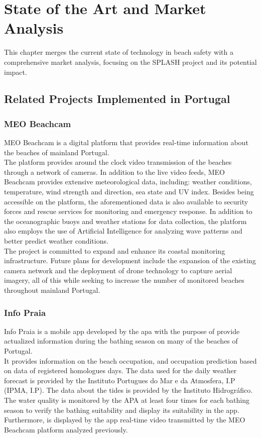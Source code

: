 \chapter{State of the Art and Market Analysis}
\label{chapter:sota}

This chapter merges the current state of technology in beach safety with a comprehensive market analysis, focusing on the SPLASH project and its potential impact.

\section{Related Projects Implemented in Portugal}
\subsection{MEO Beachcam}
MEO Beachcam is a digital platform that provides real-time information about the beaches of mainland Portugal.
\\
\indent The platform provides around the clock video transmission of the beaches through a network of cameras. In addition to the live video feeds, MEO Beachcam provides extensive meteorological data, including: weather conditions, temperature, wind strength and direction, sea state and UV index. Besides being accessible on the platform, the aforementioned data is also available to security forces and rescue services for monitoring and emergency response. In addition to the oceanographic buoys and weather stations for data collection, the platform also employs the use of Artificial Intelligence for analyzing wave patterns and better predict weather conditions. 
\\
\indent The project is committed to expand and enhance its coastal monitoring infrastructure. Future plans for development include the expansion of the existing camera network and the deployment of drone technology to capture aerial imagery, all of this while seeking to increase the number of monitored beaches throughout mainland Portugal.

\subsection{Info Praia}
Info Praia is a mobile app developed by the \ac{apa}  with the purpose of provide actualized information during the bathing season on many of the beaches of Portugal.
\\
\indent It provides information on the beach occupation, and occupation prediction based on data of registered homologues days. The data used for the daily weather forecast is provided by the Instituto Portugues do Mar e da Atmosfera, I.P (IPMA, I.P). The data about the tides  is provided by the Instituto Hidrográfico. The water quality is monitored by the APA at least four times for each bathing season to verify the bathing suitability and display its suitability in the app. Furthermore, is displayed by the app real-time video transmitted by the MEO Beachcam platform analyzed previously.
